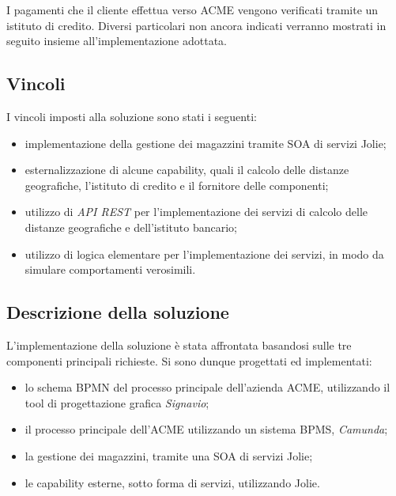 I pagamenti che il cliente effettua verso ACME vengono verificati
tramite un istituto di credito.
Diversi particolari non ancora indicati verranno mostrati in seguito
insieme all'implementazione adottata.

\subsection*{Vincoli}
I vincoli imposti alla soluzione sono stati i seguenti:
\begin{itemize}
  \item implementazione della gestione dei magazzini tramite SOA di
  servizi Jolie;
  \item esternalizzazione di alcune capability, quali il calcolo delle
  distanze \linebreak geografiche, l'istituto di credito e il fornitore delle
  componenti;
  \item utilizzo di \textit{API REST} per l'implementazione dei servizi
  di calcolo delle distanze geografiche e dell'istituto bancario;
  \item utilizzo di logica elementare per l'implementazione dei servizi,
  in modo da simulare comportamenti verosimili.
\end{itemize}

\subsection*{Descrizione della soluzione}
L'implementazione della soluzione \`e stata affrontata basandosi sulle
tre componenti principali richieste. Si sono dunque progettati ed
implementati:
\begin{itemize}
  \item lo schema BPMN del processo principale dell'azienda ACME,
  utilizzando il tool di progettazione grafica \textit{Signavio};
  \item il processo principale dell'ACME utilizzando un sistema BPMS,
  \textit{Camunda};
  \item la gestione dei magazzini, tramite una SOA di servizi Jolie;
  \item le capability esterne, sotto forma di servizi, utilizzando
  Jolie.
\end{itemize}
